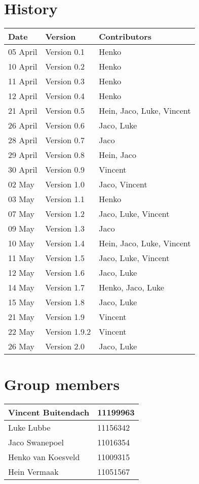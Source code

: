 
\section*{History}
\begin{center}
\begin{tabular}{|l|l|l|}
\hline
\textbf{Date} & \textbf{Version} & \textbf{Contributors}\\
\hline
05 April & Version 0.1 & Henko\\
\hline
10 April & Version 0.2 & Henko\\
\hline
11 April & Version 0.3 & Henko\\
\hline
12 April & Version 0.4 & Henko\\
\hline
21 April & Version 0.5 & Hein, Jaco, Luke, Vincent\\
\hline
26 April & Version 0.6 & Jaco, Luke\\
\hline
28 April & Version 0.7 & Jaco\\
\hline
29 April & Version 0.8 & Hein, Jaco\\
\hline
30 April & Version 0.9 & Vincent\\
\hline
02 May & Version 1.0 & Jaco, Vincent\\
\hline
03 May & Version 1.1 & Henko\\
\hline
07 May & Version 1.2 & Jaco, Luke, Vincent\\
\hline
09 May & Version 1.3 & Jaco\\
\hline
10 May & Version 1.4 & Hein, Jaco, Luke, Vincent\\
\hline
11 May & Version 1.5 & Jaco, Luke, Vincent\\
\hline
12 May & Version 1.6 & Jaco, Luke\\
\hline
14 May & Version 1.7 & Henko, Jaco, Luke\\
\hline
15 May & Version 1.8 & Jaco, Luke\\
\hline
21 May & Version 1.9 & Vincent\\
\hline
22 May & Version 1.9.2 & Vincent\\
\hline
26 May & Version 2.0 & Jaco, Luke\\
\hline
\end{tabular}

\vfill
\section*{Group members}

\begin{tabular}{|l|l|}

\hline
Vincent Buitendach & 11199963\\
\hline
Luke Lubbe & 11156342\\
\hline
Jaco Swanepoel & 11016354\\
\hline
Henko van Koesveld & 11009315\\
\hline
Hein Vermaak & 11051567\\
\hline

\end{tabular}

\end{center}

